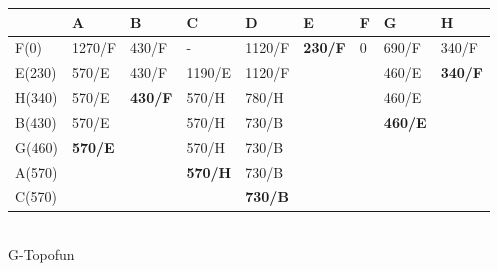 \documentclass[12pt]{article}
\begin{document}
\begin{enumerate}
\begin{center}
\begin{tabular}{|l|lll|l|llll}
\hline
 & \multicolumn{1}{l|}{A} & \multicolumn{1}{l|}{B} & C & D & \multicolumn{1}{l|}{E} & \multicolumn{1}{l|}{F} & \multicolumn{1}{l|}{G} & \multicolumn{1}{l|}{H} \\ \hline
F(0) & \multicolumn{1}{l|}{1270/F} & \multicolumn{1}{l|}{430/F} & - & 1120/F & \multicolumn{1}{l|}{\textbf{230/F}} & \multicolumn{1}{l|}{0} & \multicolumn{1}{l|}{690/F} & \multicolumn{1}{l|}{340/F} \\ \hline
E(230) & \multicolumn{1}{l|}{570/E} & \multicolumn{1}{l|}{430/F} & 1190/E & 1120/F &  & \multicolumn{1}{l|}{} & \multicolumn{1}{l|}{460/E} & \multicolumn{1}{l|}{\textbf{340/F}} \\ \cline{1-5} \cline{8-9} 
H(340) & \multicolumn{1}{l|}{570/E} & \multicolumn{1}{l|}{\textbf{430/F}} & 570/H & 780/H &  & \multicolumn{1}{l|}{} & \multicolumn{1}{l|}{460/E} &  \\ \cline{1-5} \cline{8-8}
B(430) & \multicolumn{1}{l|}{570/E} & \multicolumn{1}{l|}{} & 570/H & 730/B &  & \multicolumn{1}{l|}{} & \multicolumn{1}{l|}{\textbf{460/E}} &  \\ \cline{1-2} \cline{4-5} \cline{8-8}
G(460) & \multicolumn{1}{l|}{\textbf{570/E}} & \multicolumn{1}{l|}{} & 570/H & 730/B &  &  & \textbf{} &  \\ \cline{1-2} \cline{4-5}
A(570) &  & \multicolumn{1}{l|}{} & \textbf{570/H} & 730/B &  &  &  &  \\ \cline{1-1} \cline{4-5}
C(570) & \textbf{} &  &  & \textbf{730/B} &  & \textbf{} &  &  \\ \cline{1-1} \cline{5-5}
\end{tabular}
\\
 
         G-Topofun
         

\end{center}
\end{enumerate}
\end{document}
